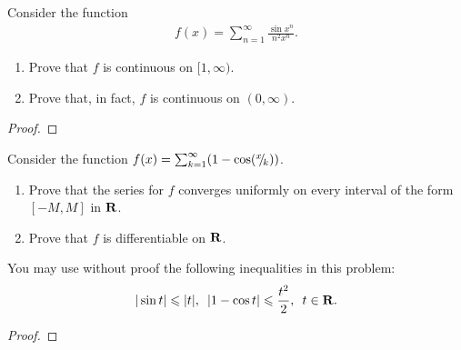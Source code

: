 \documentclass[11pt,twoside,openany]{memoir}
\begin{document}
\newpage
\fancyhead[L]{\scalebox{0.9}{Series of Functions}}
\fancyhead[R]{\scalebox{0.9}{Appeared on: W20}}
\begin{problem}
    Consider the function
    \begin{equation*}
    \begin{split}
        f(x) = \sum_{n = 1}^\infty \frac{\sin x^n}{n^2 x^n}.
    \end{split}
    \end{equation*}
    \begin{enumerate}[label = (\arabic*)]
        \item Prove that $f$ is continuous on $[1,\infty)$.
        \item Prove that, in fact, $f$ is continuous on $(0,\infty)$.
    \end{enumerate}
\end{problem}
\begin{proof}
\end{proof}

\newpage
\fancyhead[L]{\scalebox{0.9}{Series of Functions}}
\fancyhead[R]{\scalebox{0.9}{Appeared on: F19}}
\begin{problem}
    Consider the function $f(x) = \sum_{k = 1}^\infty (1-\cos (\sfrac{x}{k}))$.
        \begin{enumerate}[label = (\arabic*)]
            \item Prove that the series for $f$ converges uniformly on every interval of the form $[-M,M]$ in $\bfR$.
            \item Prove that $f$ is differentiable on $\bfR$.
        \end{enumerate}
    You may use without proof the following inequalities in this problem:
        \begin{equation*}
        \begin{split}
            |\sin t| \leq |t|, \h5 |1-\cos t| \leq \frac{t^2}{2}, \h5 t \in \bfR.
        \end{split}
        \end{equation*}
\end{problem}
\begin{proof}
\end{proof}
\end{document}
